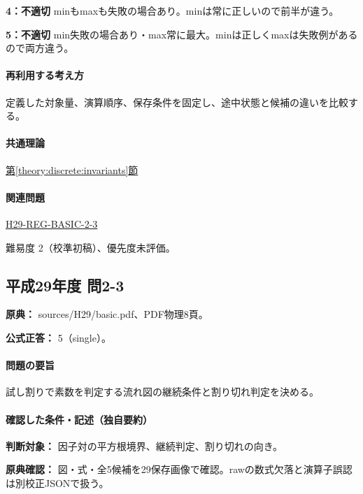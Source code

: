 \noindent\textbf{4：不適切} minもmaxも失敗の場合あり。minは常に正しいので前半が違う。\par

\noindent\textbf{5：不適切} min失敗の場合あり・max常に最大。minは正しくmaxは失敗例があるので両方違う。\par

\paragraph{再利用する考え方} 定義した対象量、演算順序、保存条件を固定し、途中状態と候補の違いを比較する。

\paragraph{共通理論} \hyperref[theory:discrete:invariants]{第\ref*{theory:discrete:invariants}節}

\paragraph{関連問題} \hyperref[q:h29-reg-basic-2-3]{H29-REG-BASIC-2-3}

\par 難易度 2（校準初稿）、優先度未評価。

\subsection{平成29年度 問2-3}
\label{q:h29-reg-basic-2-3}

\noindent\textbf{原典：} sources/H29/basic.pdf、PDF物理8頁。

\textbf{公式正答：} 5（single）。

\paragraph{問題の要旨} 試し割りで素数を判定する流れ図の継続条件と割り切れ判定を決める。

\paragraph{確認した条件・記述（独自要約）}\mbox{}\par

\noindent\textbf{判断対象：} 因子対の平方根境界、継続判定、割り切れの向き。\par

\noindent\textbf{原典確認：} 図・式・全5候補を29保存画像で確認。rawの数式欠落と演算子誤認は別校正JSONで扱う。\par


